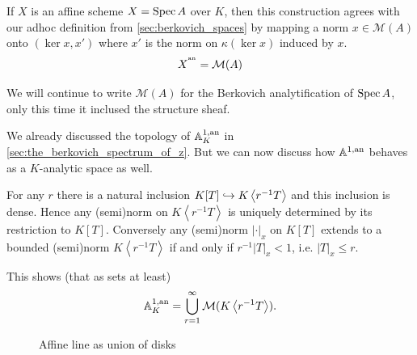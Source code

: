 \begin{remark}
	If $X$ is an affine scheme $X = \operatorname{Spec} A$ over $K$, then this construction agrees with our adhoc definition from \cref{sec:berkovich_spaces}
	by mapping a norm $x \in \mathcal{M} (A)$ onto $(\ker x, x')$ where $x'$ is the norm on $\kappa(\ker x)$ induced by $x$. 
	\[
		X^{{}^{\text{an}}} = \mathcal{M} (A)
	\] 

	We will continue to write $\mathcal{M} (A)$ for the Berkovich analytification of $\operatorname{Spec} A$, only this time it inclused the structure sheaf. 
\end{remark}



\begin{example}\label{ex:affine_line_union_disks}
	We already discussed the topology of $\mathbb{A}^{1, \text{an}}_K$ in \cref{sec:the_berkovich_spectrum_of_z}. 
	But we can now discuss how $\mathbb{A}^{1, \text{an}}$ behaves as a $K$-analytic space as well. 

	For any $r$ there is a natural inclusion $K[T] \hookrightarrow K\left<r^{-1} T \right>$ and this inclusion is dense. 
	Hence any (semi)norm on $K\left<r^{-1}T \right>$ is uniquely determined by its restriction to $K[T]$.
	Conversely any (semi)norm $|\cdot |_x$ on  $K[T]$ extends to a bounded (semi)norm $K\left<r^{-1}T \right>$ if and only if $r^{-1}|T|_x < 1$, i.e. $|T|_x \le r$. 

	This shows (that as sets at least)
	\[
		\mathbb{A}^{1, \text{an}}_K = \bigcup_{r = 1} ^{\infty} \mathcal{M} (K\left<r^{-1} T \right>)
	.\] 

\begin{figure}[ht]
    \centering
    \caption{Affine line as union of disks}
    \label{fig:affine-line-as-union-of-disks}
\end{figure}
\end{example}


